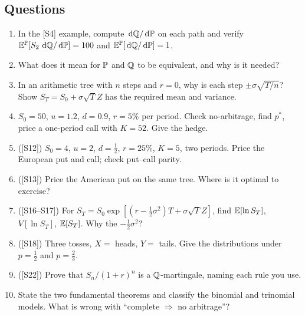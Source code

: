 \documentclass[10pt]{article}
\begin{document}
\subsection*{Questions}
\begin{enumerate}[label=Q\arabic*.]
\item In the [S4] example, compute $\,\mathrm{d}\mathbb{Q}/\,\mathrm{d}\mathbb{P}$ on each path and verify $\mathbb{E}^{\mathbb{P}}[S_2\,\,\mathrm{d}\mathbb{Q}/\,\mathrm{d}\mathbb{P}]=100$ and $\mathbb{E}^{\mathbb{P}}[\,\mathrm{d}\mathbb{Q}/\,\mathrm{d}\mathbb{P}]=1$.
\item What does it mean for $\mathbb{P}$ and $\mathbb{Q}$ to be equivalent, and why is it needed?
\item In an arithmetic tree with $n$ steps and $r=0$, why is each step $\pm\sigma\sqrt{T/n}$? Show $S_T=S_0+\sigma\sqrt TZ$ has the required mean and variance.
\item $S_0=50$, $u=1.2$, $d=0.9$, $r=5\%$ per period. Check no-arbitrage, find $p^*$, price a one-period call with $K=52$. Give the hedge.
\item ([S12]) $S_0=4$, $u=2$, $d=\frac12$, $r=25\%$, $K=5$, two periods. Price the European put and call; check put--call parity.
\item ([S13]) Price the American put on the same tree. Where is it optimal to exercise?
\item ([S16--S17]) For $S_T=S_0\exp[(r-\frac12\sigma^2)T+\sigma\sqrt TZ]$, find $\mathbb{E}[\ln S_T]$, $V[\ln S_T]$, $\mathbb{E}[S_T]$. Why the $-\frac12\sigma^2$?
\item ([S18]) Three tosses, $X=$ heads, $Y=$ tails. Give the distributions under $p=\frac12$ and $p=\frac23$.
\item ([S22]) Prove that $S_n/(1+r)^n$ is a $\mathbb{Q}$-martingale, naming each rule you use.
\item State the two fundamental theorems and classify the binomial and trinomial models. What is wrong with ``complete $\Rightarrow$ no arbitrage''?
\end{enumerate}
\end{document}
